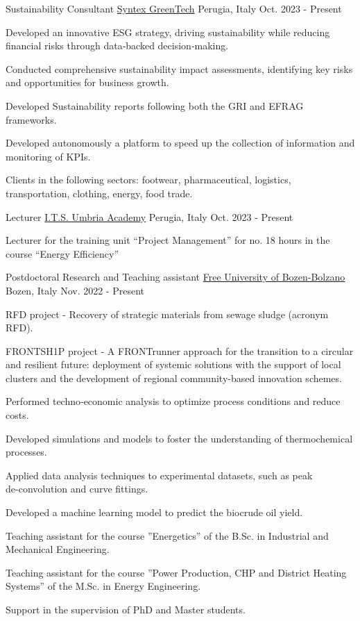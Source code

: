 
\begin{cventries}

\cventry
{Sustainability Consultant}
{\href{https://syntexgreen.tech}{Syntex GreenTech}}
{Perugia, Italy}
{Oct. 2023 - Present}
{\begin{cvitems}
\item {Developed an innovative ESG strategy, driving sustainability while reducing financial risks through data‑backed decision‑making.}
\item {Conducted comprehensive sustainability impact assessments, identifying key risks and opportunities for business growth.}
\item {Developed Sustainability reports following both the GRI and EFRAG frameworks.}
\item {Developed autonomously a platform to speed up the collection of information and monitoring of KPIs.}
\item {Clients in the following sectors: footwear, pharmaceutical, logistics, transportation, clothing, energy, food trade.}
\end{cvitems}}

\cventry
{Lecturer}
{\href{https://www.itsumbria.it/}{I.T.S. Umbria Academy}}
{Perugia, Italy}
{Oct. 2023 - Present}
{\begin{cvitems}
\item {Lecturer for the training unit “Project Management” for no. 18 hours in the course “Energy Efficiency”}
\end{cvitems}}

\cventry
{Postdoctoral Research and Teaching assistant}
{\href{https://unibz.it}{Free University of Bozen-Bolzano}}
{Bozen, Italy}
{Nov. 2022 - Present}
{\begin{cvitems}
\item {RFD project - Recovery of strategic materials from sewage sludge (acronym RFD).}
\item {FRONTSH1P project - A FRONTrunner approach for the transition to a circular and resilient future: deployment of systemic solutions with the support of local clusters and the development of regional community-based innovation schemes.}
\item {Performed techno‑economic analysis to optimize process conditions and reduce costs.}
\item {Developed simulations and models to foster the understanding of thermochemical processes.}
\item {Applied data analysis techniques to experimental datasets, such as peak de‑convolution and curve fittings.}
\item {Developed a machine learning model to predict the biocrude oil yield.}
\item {Teaching assistant for the course ”Energetics” of the B.Sc. in Industrial and Mechanical Engineering.}
\item {Teaching assistant for the course ”Power Production, CHP and District Heating Systems” of the M.Sc. in Energy Engineering.}
\item {Support in the supervision of PhD and Master students.}
\end{cvitems}}


\end{cventries}
